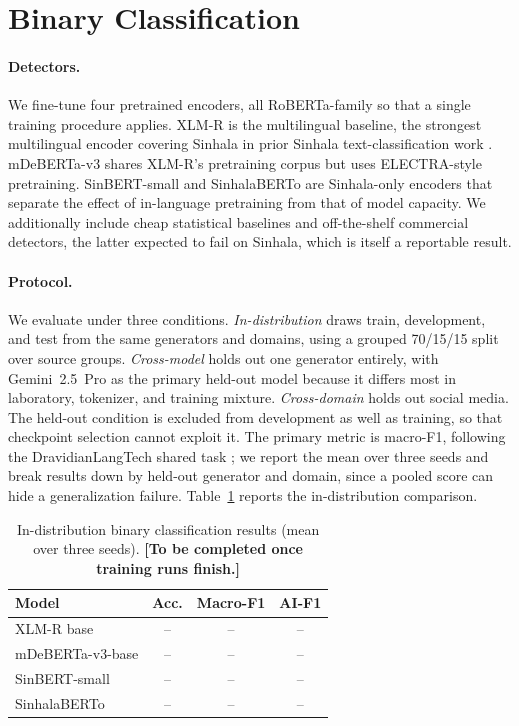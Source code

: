 \documentclass[11pt]{article}
\begin{document}
\section{Binary Classification}
\label{sec:binary}

\paragraph{Detectors.} We fine-tune four pretrained encoders, all RoBERTa-family so that a single training procedure applies. XLM-R \citep{conneau-etal-2020-unsupervised} is the multilingual baseline, the strongest multilingual encoder covering Sinhala in prior Sinhala text-classification work \citep{dhananjaya-etal-2022-bertifying}. mDeBERTa-v3 \citep{he-etal-2021-debertav3} shares XLM-R's pretraining corpus but uses ELECTRA-style pretraining. SinBERT-small \citep{dhananjaya-etal-2022-bertifying} and SinhalaBERTo \citep{liu-etal-2019-roberta, ortizsuarez-etal-2020-monolingual} are Sinhala-only encoders that separate the effect of in-language pretraining from that of model capacity. We additionally include cheap statistical baselines and off-the-shelf commercial detectors, the latter expected to fail on Sinhala, which is itself a reportable result.

\paragraph{Protocol.} We evaluate under three conditions. \emph{In-distribution} draws train, development, and test from the same generators and domains, using a grouped 70/15/15 split over source groups. \emph{Cross-model} holds out one generator entirely, with Gemini~2.5~Pro as the primary held-out model because it differs most in laboratory, tokenizer, and training mixture. \emph{Cross-domain} holds out social media. The held-out condition is excluded from development as well as training, so that checkpoint selection cannot exploit it. The primary metric is macro-F1, following the DravidianLangTech shared task \citep{kodali-etal-2025-bytesizedllm}; we report the mean over three seeds and break results down by held-out generator and domain, since a pooled score can hide a generalization failure. Table~\ref{tab:binary} reports the in-distribution comparison.

\begin{table}[t]
\centering
\small
\begin{tabular}{lccc}
\toprule
\textbf{Model} & \textbf{Acc.} & \textbf{Macro-F1} & \textbf{AI-F1} \\
\midrule
XLM-R base       & -- & -- & -- \\
mDeBERTa-v3-base & -- & -- & -- \\
SinBERT-small    & -- & -- & -- \\
SinhalaBERTo     & -- & -- & -- \\
\bottomrule
\end{tabular}
\caption{In-distribution binary classification results (mean over three seeds). \textbf{[To be completed once training runs finish.]}}
\label{tab:binary}
\end{table}
\end{document}
